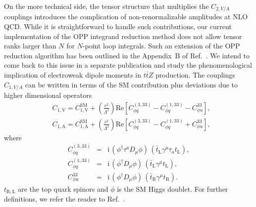 \documentclass{JHEP3}
\def\ttbZ{t\bar{t}Z}
\def\ConeA{C_{1,\mathrm{A}}}
\def\ConeV{C_{1,\mathrm{V}}}
\newcommand{\be}{\begin{eqnarray}}
\newcommand{\ee}{\end{eqnarray}}
\begin{document}
On the more technical side, the tensor structure that multiplies the $C_{2,V/A}$ couplings introduces the complication of 
non-renormalizable amplitudes at NLO QCD.
While it is straightforward to handle such contributions, our current implementation of the OPP integrand reduction method 
does not allow tensor ranks larger than $N$ for $N$-point loop integrals.
Such an extension of the OPP reduction algorithm has been outlined in the Appendix~B of Ref.~\cite{Mastrolia:2012bu}. 
We intend to come back to this issue in a separate publication and study the phenomenological implication of electroweak dipole moments in $\ttbZ$ production.
The couplings $C_{1,V/A}$ can be written in terms of the SM contribution plus deviations due to higher dimensional operators
\be
   \label{Cone_NP}
   &\ConeV=\ConeV^\mathrm{SM}+\left(\frac{v^2}{\Lambda^2} \right) \mathrm{Re} \left[ C^{(3,33)}_{\phi q} - C^{(1,33)}_{\phi q} - C^{33}_{\phi u}   \right],
   \\
   &\ConeA=\ConeA^\mathrm{SM}+\left(\frac{v^2}{\Lambda^2} \right) \mathrm{Re}\left[  C^{(3,33)}_{\phi q} - C^{(1,33)}_{\phi q} + C^{33}_{\phi u}  \right],
   \nonumber
\ee
where 
\be  
  \label{EFTOp}
  C^{(3,33)}_{\phi q} &=& \mathrm{i} \, (\phi^\dagger \tau^a D_\mu \phi) \, (\bar{t}_\mathrm{L} \gamma^\mu \tau_a t_\mathrm{L})  ,
  \nonumber \\
  C^{(1,33)}_{\phi q} &=& \mathrm{i} \, (\phi^\dagger D_\mu \phi) \, (\bar{t}_\mathrm{L} \gamma^\mu t_\mathrm{L})  ,
 \\
  C^{33}_{\phi u} &=& \mathrm{i} \, (\phi^\dagger D_\mu \phi) \, (\bar{t}_\mathrm{R} \gamma^\mu t_\mathrm{R}).
  \nonumber
\ee
$t_\mathrm{R,L}$ are the top quark spinors and $\phi$ is the SM Higgs doublet. 
For further definitions, we refer the reader to Ref.~\cite{AguilarSaavedra:2008zc}.
\\
\end{document}
